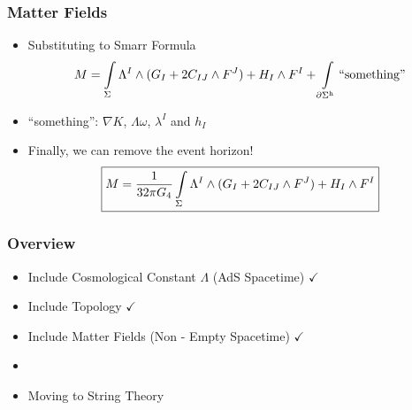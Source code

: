 \documentclass[t]{beamer}
\begin{document}

\begin{frame}
\frametitle{Matter Fields}

\begin{itemize}
\setlength{\parskip}{10pt}

\item<1-> Substituting to Smarr Formula
\vspace{0.8em}
\begin{align}
M = \int\limits_{\Sigma} \Lambda^I \wedge (G_I + 2C_{IJ} \wedge F^J ) +  H_{I} \wedge F^I
+ \int\limits_{\partial\Sigma^{\text{h}}}\text{``something''} \notag
\end{align}

\item<2-> ``something'': $\nabla K$, $\Lambda \omega$, $\lambda^I$ and $h_I$

\item<3-> Finally, we can remove the event horizon!
\vspace{0.8em}
\begin{align}
\boxed{
M  = \frac{1}{32\pi G_{4}} \int\limits_{\Sigma} \Lambda^I \wedge (G_I + 2C_{IJ} \wedge F^J ) +  H_{I} \wedge F^I}\notag
\end{align}


\end{itemize}
\end{frame}


\begin{frame}
\frametitle{Overview}

\begin{itemize}
\setlength{\parskip}{10pt}
\item Include Cosmological Constant $\Lambda$ (AdS Spacetime) $\checkmark$
\item Include Topology $\checkmark$
\item Include Matter Fields (Non - Empty Spacetime) $\checkmark$
\item {}
\item Moving to String Theory
\end{itemize}
\end{frame}

\end{document}
